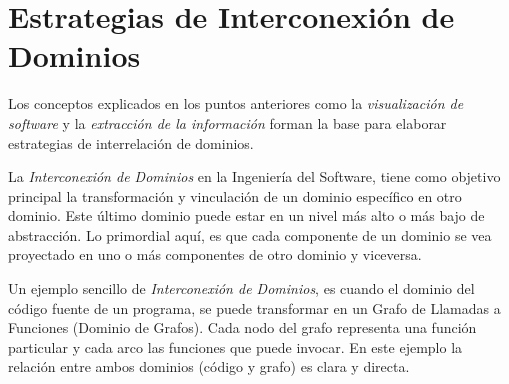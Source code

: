 

\section{Estrategias de Interconexión de \\Dominios}

Los conceptos explicados en los puntos anteriores como la \textit{visualización de software} y la \textit{extracción de la información} forman la base para elaborar estrategias de interrelación de dominios.

La \textit{Interconexión de Dominios} en la Ingeniería del Software, tiene como objetivo principal la transformación y vinculación de un dominio específico en otro dominio. Este último dominio puede estar en un nivel más alto o más bajo de abstracción. Lo primordial aquí, es que cada componente de un dominio se vea proyectado en uno o más componentes de otro dominio y viceversa.


Un ejemplo sencillo de \textit{Interconexión de Dominios}, es cuando el dominio del código fuente de un programa, se puede transformar en un Grafo de Llamadas a Funciones (Dominio de Grafos). Cada nodo del grafo representa una función particular y cada arco las funciones que puede invocar. En este ejemplo la relación entre ambos dominios (código y grafo) es clara y directa. 

